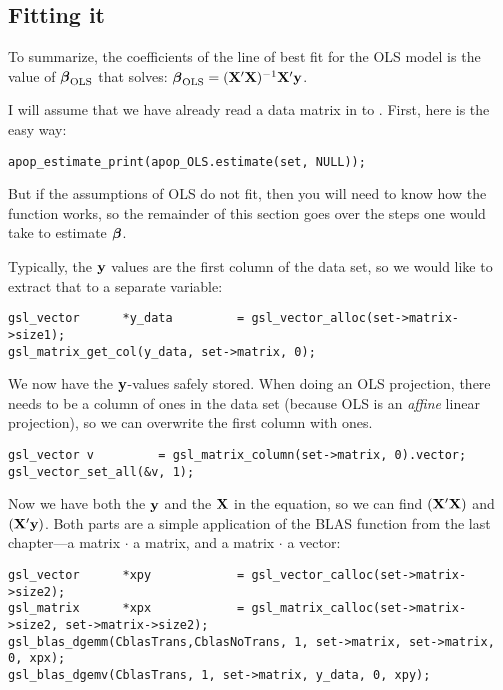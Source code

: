 
\subsection{Fitting it} 
To summarize,
the coefficients of  the line of best fit for the OLS model is the value of ${\mbox{\boldmath$\beta$}}_{\rm OLS}$ that solves:
$ {\mbox{\boldmath$\beta$}}_{\rm OLS} = ({\bf X}'{\bf X})^{-1}{\bf X}'{\bf y}$.

I will assume that we have already read a data matrix in to . First, here is the easy way:
\begin{lstlisting}
apop_estimate_print(apop_OLS.estimate(set, NULL));
\end{lstlisting}
But if the assumptions of OLS do not fit, then you will need to know how
the  function works, so the remainder of this
section goes over the steps one would take to estimate ${\mbox{\boldmath$\beta$}}$.  

Typically, the ${\bf y}$
values are the first column of the data set, so we would like to extract that to a separate variable:
\begin{lstlisting}
gsl_vector      *y_data         = gsl_vector_alloc(set->matrix->size1);
gsl_matrix_get_col(y_data, set->matrix, 0);
\end{lstlisting}

We now have the ${\bf y}$-values safely stored.  When doing an OLS projection,
there needs to be a column of ones in the data set (because OLS is an
{\sl affine} linear projection), so we can overwrite the first column
with ones. 
\begin{lstlisting}
gsl_vector v         = gsl_matrix_column(set->matrix, 0).vector;
gsl_vector_set_all(&v, 1);  
\end{lstlisting}


Now we have both the ${\bf y}$ and the ${\bf X}$ in the equation, so we can find $({\bf X}'{\bf X})$ and $({\bf X}'{\bf y})$.
Both parts are a
simple application of the BLAS function from the last chapter---a matrix $\cdot$ a matrix, and a matrix $\cdot$ a vector:
\begin{lstlisting}
gsl_vector      *xpy            = gsl_vector_calloc(set->matrix->size2);
gsl_matrix      *xpx            = gsl_matrix_calloc(set->matrix->size2, set->matrix->size2);
gsl_blas_dgemm(CblasTrans,CblasNoTrans, 1, set->matrix, set->matrix, 0, xpx);
gsl_blas_dgemv(CblasTrans, 1, set->matrix, y_data, 0, xpy);
\end{lstlisting}

